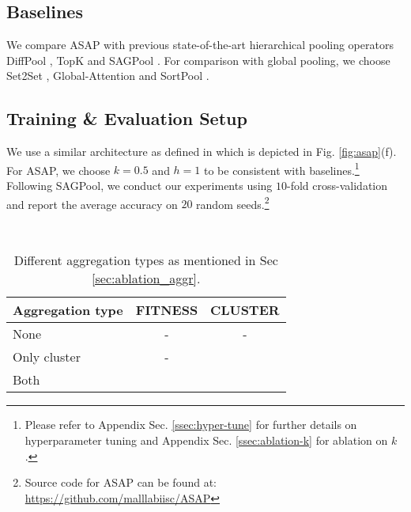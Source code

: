 \documentclass[letterpaper]{article} \usepackage{aaai20}  \usepackage{times}  \usepackage{helvet} \usepackage{courier}  \usepackage[hyphens]{url}  \usepackage{graphicx} \urlstyle{rm} \def\UrlFont{\rm}  \usepackage{graphicx}  \frenchspacing  \setlength{\pdfpagewidth}{8.5in}  \setlength{\pdfpageheight}{11in}
\newcommand{\cmark}{\ding{51}}
\begin{document}
\begin{table}[!tbh]
	\centering
	\caption{\label{tab:stats} Statistics of the graph datasets. $\text{G}_{avg}$, $\text{C}_{avg}$, $\text{V}_{avg}$ and $\text{E}_{avg}$ denotes the average number of graphs, classes, nodes and edges respectively.}
\end{table}


\subsection{Baselines}
We compare ASAP with previous state-of-the-art hierarchical pooling operators DiffPool \cite{diffpool}, TopK \cite{topk} and SAGPool \cite{sag}. For comparison with global pooling, we choose Set2Set \cite{set2set}, Global-Attention \cite{glob-att} and SortPool \cite{sortpool}.

\subsection{Training \& Evaluation Setup}
We use a similar architecture as defined in \cite{topk2,sag} which is depicted in Fig. \ref{fig:asap}(f). For ASAP, we choose $k = 0.5$ and $h = 1$ to be consistent with baselines.\footnote{Please refer to Appendix Sec. \ref{ssec:hyper-tune} for further details on hyperparameter tuning and Appendix Sec. \ref{ssec:ablation-k} for ablation on $k$.} Following SAGPool\cite{sag}, we conduct our experiments using $10$-fold cross-validation and report the average accuracy on $20$ random seeds.\footnote{Source code for ASAP can be found at: \url{https://github.com/malllabiisc/ASAP}}


\begin{table}[!tbh]\
	\small
	\centering
	\begin{tabular}{lcc}
		\toprule
		Aggregation type & FITNESS & CLUSTER \\
		\midrule
		None 		& - 		& - 		\\
		Only cluster 		& - 		& \cmark 	\\
		Both 		& \cmark 	& \cmark 	\\
		\bottomrule
	\end{tabular}
	\caption{\label{tab:aggr_types} Different aggregation types as mentioned in Sec \ref{sec:ablation_aggr}.}
\end{table}
\end{document}
